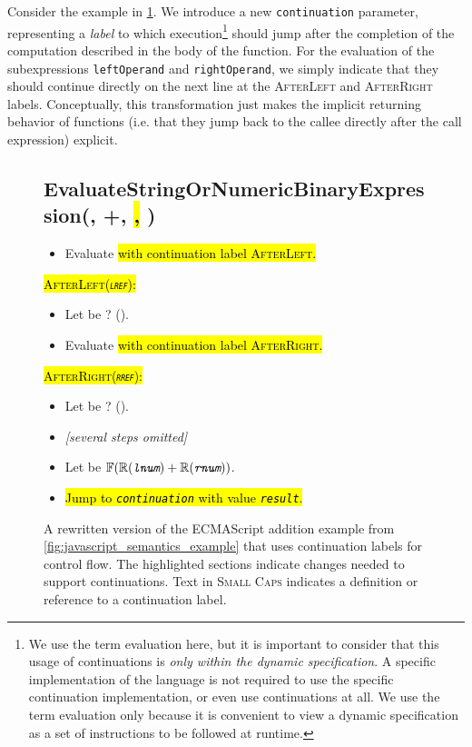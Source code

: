 Consider the example in \cref{fig:continuation_introduction}. We introduce a new \texttt{continuation} parameter, representing a \textit{label} to which execution\footnote{We use the term evaluation here, but it is important to consider that this usage of continuations is \textit{only within the dynamic specification}. A specific implementation of the language is not required to use the specific continuation implementation, or even use continuations at all. We use the term evaluation only because it is convenient to view a dynamic specification as a set of instructions to be followed at runtime.} should jump after the completion of the computation described in the body of the function. For the evaluation of the subexpressions \texttt{leftOperand} and \texttt{rightOperand}, we simply indicate that they should continue directly on the next line at the \textsc{AfterLeft} and \textsc{AfterRight} labels. Conceptually, this transformation just makes the implicit returning behavior of functions (i.e. that they jump back to the callee directly after the call expression) explicit.\\

\begin{figure}
  \subsection*{EvaluateStringOrNumericBinaryExpression(, +, \hl{, })}
  \begin{itemize}
    \item Evaluate \hl{ with continuation label \textsc{AfterLeft}.}
  \end{itemize}
\hl{\textsc{\small AfterLeft(\textit{\texttt{lref}})}:}
  \begin{itemize}
    \item Let  be ? ().
    \item Evaluate \hl{ with continuation label \textsc{AfterRight}.}
  \end{itemize}
\hl{\textsc{\small AfterRight(\textit{\texttt{rref}})}:}
  \begin{itemize}
    \item Let  be ? ().
    \item \textit{[several steps omitted]}
    \item Let  be $ \mathbb{F}(\mathbb{R}(\textit{\texttt{lnum}}) + \mathbb{R}(\textit{\texttt{rnum}})) $.
    \item \hl{Jump to \textit{\texttt{continuation}} with value \textit{\texttt{result}}.}
  \end{itemize}
  \caption{A rewritten version of the ECMAScript addition example from \cref{fig:javascript_semantics_example} that uses continuation labels for control flow. The highlighted sections indicate changes needed to support continuations. Text in \textsc{Small Caps} indicates a definition or reference to a continuation label.}
  \label{fig:continuation_introduction}
\end{figure}

